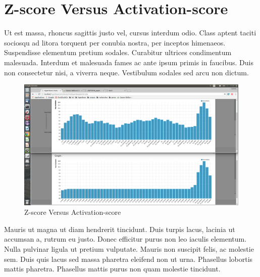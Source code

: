 \section{Z-score Versus Activation-score}

Ut est massa, rhoncus sagittis justo vel, cursus interdum odio. Class aptent taciti sociosqu ad litora torquent per conubia nostra, per inceptos himenaeos. Suspendisse elementum pretium sodales. Curabitur ultrices condimentum malesuada. Interdum et malesuada fames ac ante ipsum primis in faucibus. Duis non consectetur nisi, a viverra neque. Vestibulum sodales sed arcu non dictum.


\begin{figure}[h]
\begin{center}
\includegraphics[width=16cm]{img/comaprison.png}
\caption{Z-score Versus Activation-score}
\label{cnn}
\end{center}
\end{figure}

Mauris ut magna ut diam hendrerit tincidunt. Duis turpis lacus, lacinia ut accumsan a, rutrum eu justo. Donec efficitur purus non leo iaculis elementum. Nulla pulvinar ligula ut pretium vulputate. Mauris non suscipit felis, ac molestie sem. Duis quis lacus sed massa pharetra eleifend non ut urna. Phasellus lobortis mattis pharetra. Phasellus mattis purus non quam molestie tincidunt.